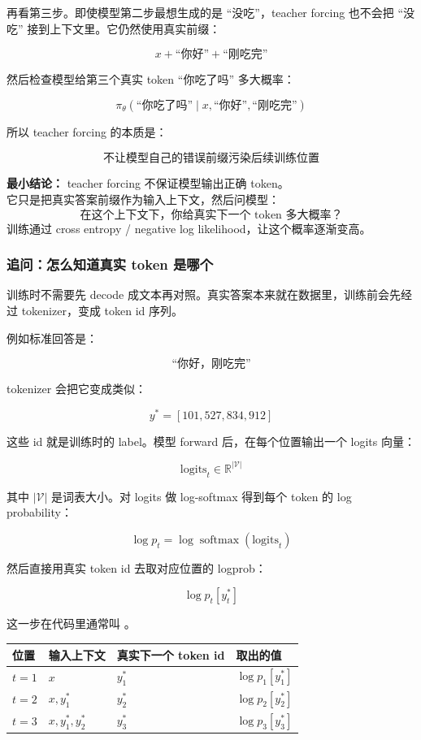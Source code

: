 再看第三步。即使模型第二步最想生成的是 ``没吃''，teacher forcing 也不会把 ``没吃'' 接到上下文里。它仍然使用真实前缀：

\[
x + \text{``你好''} + \text{``刚吃完''}
\]

然后检查模型给第三个真实 token ``你吃了吗'' 多大概率：

\[
\pi_\theta(\text{``你吃了吗''} \mid x, \text{``你好''}, \text{``刚吃完''})
\]

所以 teacher forcing 的本质是：

\[
\text{不让模型自己的错误前缀污染后续训练位置}
\]

\begin{summarybox}
\textbf{最小结论：} teacher forcing 不保证模型输出正确 token。\\
它只是把真实答案前缀作为输入上下文，然后问模型：
\[
\text{在这个上下文下，你给真实下一个 token 多大概率？}
\]
训练通过 cross entropy / negative log likelihood，让这个概率逐渐变高。
\end{summarybox}

\subsubsection{追问：怎么知道真实 token 是哪个}

训练时不需要先 decode 成文本再对照。真实答案本来就在数据里，训练前会先经过 tokenizer，变成 token id 序列。

例如标准回答是：

\[
\text{``你好，刚吃完''}
\]

tokenizer 会把它变成类似：

\[
y^\ast = [101, 527, 834, 912]
\]

这些 id 就是训练时的 label。模型 forward 后，在每个位置输出一个 logits 向量：

\[
\text{logits}_t \in \mathbb{R}^{|\mathcal{V}|}
\]

其中 $|\mathcal{V}|$ 是词表大小。对 logits 做 log-softmax 得到每个 token 的 log probability：

\[
\log p_t = \log \operatorname{softmax}(\text{logits}_t)
\]

然后直接用真实 token id 去取对应位置的 logprob：

\[
\log p_t[y_t^\ast]
\]

这一步在代码里通常叫 。

\begin{center}
{\small
\begin{tabular}{p{2.2cm}p{3.2cm}p{3.2cm}p{3.2cm}}
\hline
\textbf{位置} & \textbf{输入上下文} & \textbf{真实下一个 token id} & \textbf{取出的值} \\
\hline
$t=1$ & $x$ & $y_1^\ast$ & $\log p_1[y_1^\ast]$ \\
$t=2$ & $x,y_1^\ast$ & $y_2^\ast$ & $\log p_2[y_2^\ast]$ \\
$t=3$ & $x,y_1^\ast,y_2^\ast$ & $y_3^\ast$ & $\log p_3[y_3^\ast]$ \\
\hline
\end{tabular}
}
\end{center}

